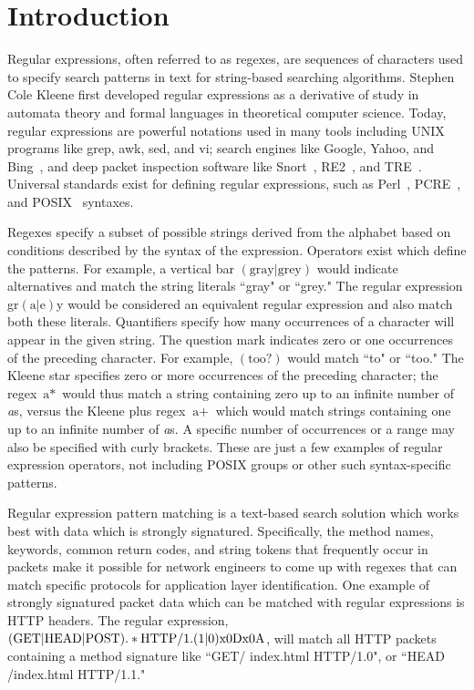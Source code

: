 \section{Introduction}
Regular expressions, often referred to as regexes, are sequences of characters used to specify search patterns in text for string-based searching algorithms. Stephen Cole Kleene first developed regular expressions as a derivative of study in automata theory and formal languages in theoretical computer science. Today, regular expressions are powerful notations used in many tools including UNIX programs like grep, awk, sed, and vi; search engines like Google, Yahoo, and Bing~\cite{}, and deep packet inspection software like Snort~\cite{}, RE2~\cite{}, and TRE~\cite{}. Universal standards exist for defining regular expressions, such as Perl~\cite{}, PCRE~\cite{}, and POSIX~\cite{} syntaxes.

Regexes specify a subset of possible strings derived from the alphabet based on conditions described by the syntax of the expression. Operators exist which define the patterns. For example, a vertical bar $(\text{gray}\vert\text{grey})$ would indicate alternatives and match the string literals ``gray" or ``grey." The regular expression gr$(\text{a}\vert\text{e})$y would be considered an equivalent regular expression and also match both these literals. Quantifiers specify how many occurrences of a character will appear in the given string. The question mark indicates zero or one occurrences of the preceding character. For example, $(\text{too}?)$ would match ``to" or ``too." The Kleene star specifies zero or more occurrences of the preceding character; the regex $\text{a}*$ would thus match a string containing zero up to an infinite number of \textit{a}s, versus the Kleene plus regex $\text{a}+$ which would match strings containing one up to an infinite number of \textit{a}s. A specific number of occurrences or a range may also be specified with curly brackets. These are just a few examples of regular expression operators, not including POSIX groups or other such syntax-specific patterns.

Regular expression pattern matching is a text-based search solution which works best with data which is strongly signatured. Specifically, the method names, keywords, common return codes, and string tokens that frequently occur in packets make it possible for network engineers to come up with regexes that can match specific protocols for application layer identification. One example of strongly signatured packet data which can be matched with regular expressions is HTTP headers. The regular expression, $(\text{GET}|\text{HEAD}|\text{POST}).*\text{HTTP}/1.(1|0)\text{\\x0D\\x0A}$, will match all HTTP packets containing a method signature like ``GET/ index.html HTTP/1.0", or ``HEAD /index.html HTTP/1.1."

